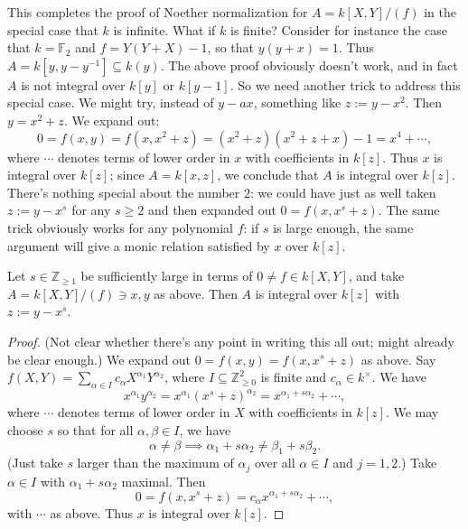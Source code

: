 \documentclass[reqno]{amsart}
\begin{document}
This completes the proof of Noether normalization for
\(A = k[X,Y]/(f)\) in the special case that \(k\) is infinite.  What
if \(k\) is finite?
Consider for instance the case that \(k = \mathbb{F}_2\)
and
\(f = Y(Y+ X)- 1\),
so that \(y (y+x) = 1\).
Thus \(A = k[y, y - y^{-1}] \subseteq k(y)\).
The above proof obviously doesn't work, and
in fact \(A\) is not integral over \(k[y]\) or \(k[y-1]\).
So we
need another trick to address this special case.
We might try, instead of \(y - a x\),
something like \(z := y - x^2\).
Then \(y = x^2 + z\).
We expand out:
\[0 =
    f(x,y)
    = f(x,x^2 + z)
    = (x^2 + z)(x^2 + z + x) - 1
    = x^4 + \dotsb,
  \]
where \(\dotsb\) denotes terms
of lower order in \(x\) with coefficients in \(k[z]\).
Thus \(x\) is integral over \(k[z]\);
since \(A = k[x,z]\),
we conclude that \(A\) is integral over \(k[z]\).
There's nothing special  about the number \(2\):
we could have just as well taken \(z := y - x^s\) for any \(s \geq 2\)
and then expanded out \(0 = f(x, x^s + z)\).
The same trick obviously works for any polynomial \(f\):
if \(s\) is large enough, the same argument will give a monic relation satisfied
by \(x\) over \(k[z]\).
\begin{lemma}
  Let $s \in \mathbb{Z}_{\geq 1}$ be sufficiently large in terms
  of $0 \neq f  \in k[X,Y]$,
  and take
  $A = k[X,Y]/(f)\ni x,y$ as above.
  Then $A$ is integral over $k[z]$ with $z := y - x^s$.
\end{lemma}
\begin{proof}
  (Not clear whether there's any point in writing this all out; might already be clear enough.)
  We expand out $0 = f(x,y) = f(x,x^s+z)$ as above.
  Say $f(X,Y) = \sum_{\alpha \in I} c_\alpha X^{\alpha_1}
  Y^{\alpha_2}$,
  where $I \subseteq \mathbb{Z}_{\geq 0}^2$ is finite and
  $c_\alpha \in k^\times$.
  We have
  \[
    x^{\alpha_1} y^{\alpha_2} = x^{\alpha_1} (x^s +
    z)^{\alpha_2}
    = x^{\alpha_1 + s \alpha_2} + \dotsb,
  \]
  where $\dotsb$ denotes terms of lower order in $X$ with
  coefficients in $k[z]$.
  We may choose $s$ so that for all $\alpha, \beta \in I$,
  we have
  \[
    \alpha \neq \beta \implies \alpha_1 + s \alpha_2 \neq \beta_1 + s \beta _2.
  \]
  (Just take $s$ larger than the maximum of $\alpha_j$ over all
  $\alpha \in I$ and $j = 1,2$.)
  Take $\alpha \in I$
  with $\alpha_1 + s \alpha_2$ maximal.
  Then
  \[
    0 = f(x,x^s + z)
    = c_\alpha x^{\alpha_1 + s \alpha_2} + \dotsb,
  \]
  with $\dotsb$ as above.
  Thus $x$ is integral over $k[z]$.
\end{proof}
\end{document}
